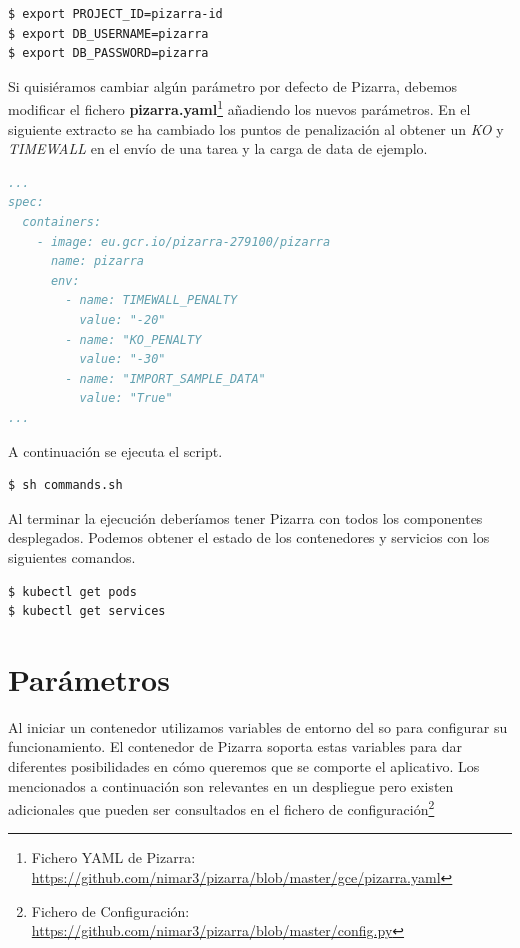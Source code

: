 \documentclass[11pt,spanish,listoffigures,listoftables]{tfgetsinf}
\begin{document}
\begin{lstlisting}[language=bash]
$ export PROJECT_ID=pizarra-id
$ export DB_USERNAME=pizarra
$ export DB_PASSWORD=pizarra
\end{lstlisting}

Si quisiéramos cambiar algún parámetro por defecto de Pizarra, debemos modificar el fichero \textbf{pizarra.yaml}\footnote{Fichero YAML de Pizarra: \url{https://github.com/nimar3/pizarra/blob/master/gce/pizarra.yaml}} añadiendo los nuevos parámetros. En el siguiente extracto se ha cambiado los puntos de penalización al obtener un \textit{KO} y \textit{TIMEWALL} en el envío de una \Gls{tarea} y la carga de data de ejemplo.

\begin{lstlisting}[language=yaml]
...
spec:
  containers:
    - image: eu.gcr.io/pizarra-279100/pizarra
      name: pizarra
      env:
        - name: TIMEWALL_PENALTY
          value: "-20"
        - name: "KO_PENALTY
          value: "-30"
        - name: "IMPORT_SAMPLE_DATA"
          value: "True"
...          
\end{lstlisting}

A continuación se ejecuta el script.

\begin{lstlisting}[language=bash]
$ sh commands.sh
\end{lstlisting}

Al terminar la ejecución deberíamos tener Pizarra con todos los componentes desplegados. Podemos obtener el estado de los contenedores y servicios con los siguientes comandos.

\begin{lstlisting}[language=bash]
$ kubectl get pods
$ kubectl get services
\end{lstlisting}

\section{Parámetros}

Al iniciar un \Gls{contenedor} utilizamos variables de entorno del \acrshort{so} para configurar su funcionamiento. El \Gls{contenedor} de Pizarra soporta estas variables para dar diferentes posibilidades en cómo queremos que se comporte el aplicativo. Los mencionados a continuación son relevantes en un despliegue pero existen adicionales que pueden ser consultados en el fichero de configuración\footnote{Fichero de Configuración: \url{https://github.com/nimar3/pizarra/blob/master/config.py}}
\end{document}
